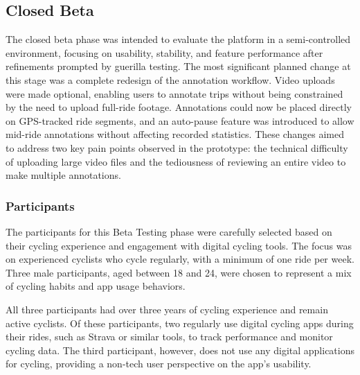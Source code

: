\subsection{Closed Beta}

The closed beta phase was intended to evaluate the platform in a semi-controlled environment, focusing on usability, stability, and feature performance after refinements prompted by guerilla testing. The most significant planned change at this stage was a complete redesign of the annotation workflow. Video uploads were made optional, enabling users to annotate trips without being constrained by the need to upload full-ride footage. Annotations could now be placed directly on GPS-tracked ride segments, and an auto-pause feature was introduced to allow mid-ride annotations without affecting recorded statistics. These changes aimed to address two key pain points observed in the prototype: the technical difficulty of uploading large video files and the tediousness of reviewing an entire video to make multiple annotations.

\subsubsection{Participants}
The participants for this Beta Testing phase were carefully selected based on their cycling experience and engagement with digital cycling tools. The focus was on experienced cyclists who cycle regularly, with a minimum of one ride per week. Three male participants, aged between 18 and 24, were chosen to represent a mix of cycling habits and app usage behaviors.

All three participants had over three years of cycling experience and remain active cyclists. Of these participants, two regularly use digital cycling apps during their rides, such as Strava or similar tools, to track performance and monitor cycling data. The third participant, however, does not use any digital applications for cycling, providing a non-tech user perspective on the app's usability.


